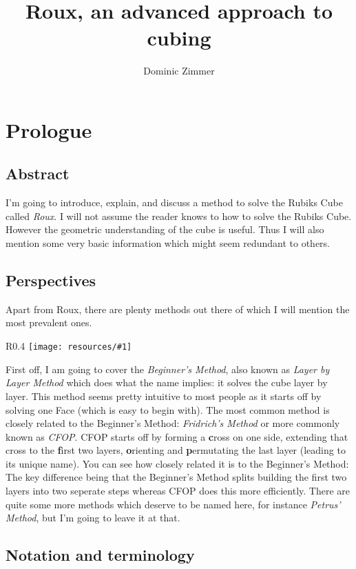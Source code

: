 \documentclass{scrreprt}
\newcommand{\wrapfig}[5] {
	\begin{wrapfigure}{#2}{#3\textwidth}
	\centering
	\texttt{[image: resources/\#1]}
	\caption*{#5}
	\end{wrapfigure}
}
\begin{document}
\title{Roux, an advanced approach to cubing}
\author{Dominic Zimmer}
\maketitle 

\tableofcontents
\chapter{Prologue}

\section{Abstract}
I'm going to introduce, explain, and discuss a method to solve the Rubiks Cube called \emph{Roux}. I will not assume the reader knows to how to solve the Rubiks Cube. However the geometric understanding of the cube is useful. Thus I will also mention some very basic information which might seem redundant to others.

\section{Perspectives}
Apart from Roux, there are plenty methods out there of which I will mention the most prevalent ones.

\wrapfig{union.png}{R}{0.4}{0.3}{The four steps of using the Beginners Method}

First off, I am going to cover the \emph{Beginner's Method}, also known as \emph{Layer by Layer Method} which does what the name implies: it solves the cube layer by layer. This method seems pretty intuitive to most people as it starts off by solving one Face (which is easy to begin with). The most common method is closely related to the Beginner's Method: \emph{Fridrich's Method} or more commonly known as \emph{CFOP}. CFOP starts off by forming a \textbf{c}ross on one side, extending that cross to the \textbf{f}irst two layers, \textbf{o}rienting and \textbf{p}ermutating the last layer (leading to its unique name). You can see how closely related it is to the Beginner's Method: The key difference being that the Beginner's Method splits building the first two layers into two seperate steps whereas CFOP does this more efficiently. There are quite some more methods which deserve to be named here, for instance \emph{Petrus' Method}, but I'm going to leave it at that.


\section{Notation and terminology}
\end{document}
